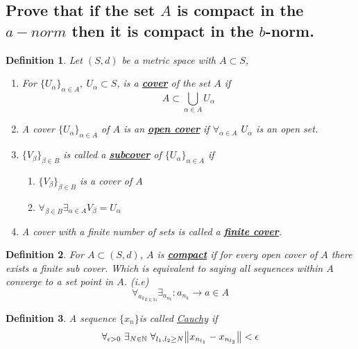 \documentclass[]{article}
\newcommand{\N}{\mathbb{N}}
\newtheorem{definition}{Definition}
\begin{document}
\subsection{Prove that if the set $A$ is compact in the $a-norm$ then it is compact in the $b$-norm.}
\begin{definition}
    Let $(S,d)$ be a metric space with $A \subset S$,
    \begin{enumerate}
        \item For $\{U_\alpha\}_{\alpha \in A}, \ U_\alpha \subset S$, is a \textbf{\underline{cover}} of the set $A$ if 
        $$A \subset \bigcup_{\alpha\in A} U_\alpha$$
        \item A cover $\{U_\alpha\}_{\alpha \in A}$ of $A$ is an \textbf{\underline{open cover}} if $\forall_{\alpha \in A}$ $U_\alpha$ is an open set.
        \item $\{V_\beta\}_{\beta\in B}$ is called a \textbf{\underline{subcover}} of $\{U_\alpha\}_{\alpha \in A}$ if
        \begin{enumerate}
            \item $\{V_\beta\}_{\beta\in B}$ is a cover of $A$
            \item $\forall_{\beta \in B} \exists_{\alpha \in A} V_\beta = U_\alpha$
        \end{enumerate}
        \item A cover with a finite number of sets is called a \textbf{\underline{finite cover}}.
    \end{enumerate}
\end{definition}
\begin{definition}
    For $A \subset (S,d)$, $A$ is \textbf{\underline{compact}} if for every open cover of $A$ there exists a finite sub cover.
    Which is equivalent to saying all sequences within $A$ converge to a set point in $A$. (i.e)
    \[\forall_{{a_k}_{k\in \N}} \exists_{{a_{n_k}}} : a_{n_k} \to a \in A\]
\end{definition}
\begin{definition}
    A sequence $\{x_{n}\}$is called \underline{Cauchy} if 
    \[
        \forall_{\epsilon>0} \ \exists_{N \in \N} \ \forall_{l_1,l_2 \geq N} \norm{x_{n_{l_1}} - x_{n_{l_2}}} < \epsilon
    \]
\end{definition}
\end{document}
